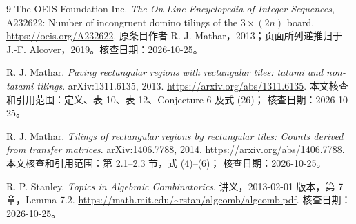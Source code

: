 \begin{thebibliography}{9}
The OEIS Foundation Inc.
\emph{The On-Line Encyclopedia of Integer Sequences}, A232622:
Number of incongruent domino tilings of the $3\times(2n)$ board.
\url{https://oeis.org/A232622}.
原条目作者 R. J. Mathar，2013；页面所列递推归于
J.-F. Alcover，2019。核查日期：2026-10-25。

R. J. Mathar.
\emph{Paving rectangular regions with rectangular tiles: tatami and non-tatami tilings}.
arXiv:1311.6135, 2013.
\url{https://arxiv.org/abs/1311.6135}.
本文核查和引用范围：定义、表 10、表 12、Conjecture 6 及式 (26)；
核查日期：2026-10-25。

R. J. Mathar.
\emph{Tilings of rectangular regions by rectangular tiles: Counts derived from transfer matrices}.
arXiv:1406.7788, 2014.
\url{https://arxiv.org/abs/1406.7788}.
本文核查和引用范围：第 2.1--2.3 节，式 (4)--(6)；
核查日期：2026-10-25。

R. P. Stanley.
\emph{Topics in Algebraic Combinatorics}.
讲义，2013-02-01 版本，第 7 章，Lemma 7.2.
\url{https://math.mit.edu/~rstan/algcomb/algcomb.pdf}.
核查日期：2026-10-25。
\end{thebibliography}
